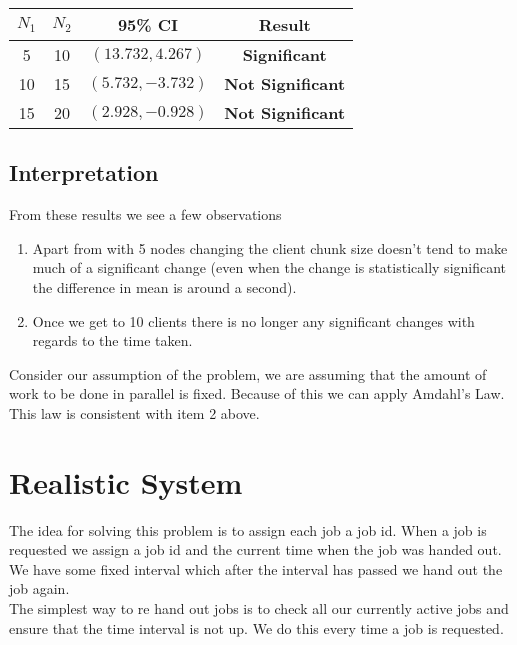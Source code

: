 \documentclass[a4paper, 12pt]{article}
\begin{document}
			\begin{table}[H]
				\begin{center}
					\begin{tabular}{| c | c | c | c |}
						\hline
						$N_1$ & $N_2$ & 95\% CI & Result \\
						\hline
						5 & 10 & $(13.732, 4.267)$ & \textbf{Significant} \\
						10 & 15 & $(5.732, -3.732)$ & \textbf{Not Significant} \\
						15 & 20 & $(2.928, -0.928)$ & \textbf{Not Significant} \\
						
						\hline				
					\end{tabular}
				\end{center}
			\end{table}
			
		\subsection{Interpretation}
			From these results we see a few observations
			
			\begin{enumerate}
				\item Apart from with 5 nodes changing the client chunk size doesn't tend to make much of a significant change (even when the change is statistically significant the difference in mean is around a second).
				
				\item Once we get to 10 clients there is no longer any significant changes with regards to the time taken.
			\end{enumerate}
			
			
			Consider our assumption of the problem, we are assuming that the amount of work to be done in parallel is fixed. Because of this we can apply Amdahl's Law. This law is consistent with item 2 above.
			
			
	\section{Realistic System}
		The idea for solving this problem is to assign each job a job id. When a job is requested we assign a job id and the current time when the job was handed out. We have some fixed interval which after the interval has passed we hand out the job again.\\
		
		The simplest way to re hand out jobs is to check all our currently active jobs and ensure that the time interval is not up. We do this every time a job is requested.\\
		
\end{document}
